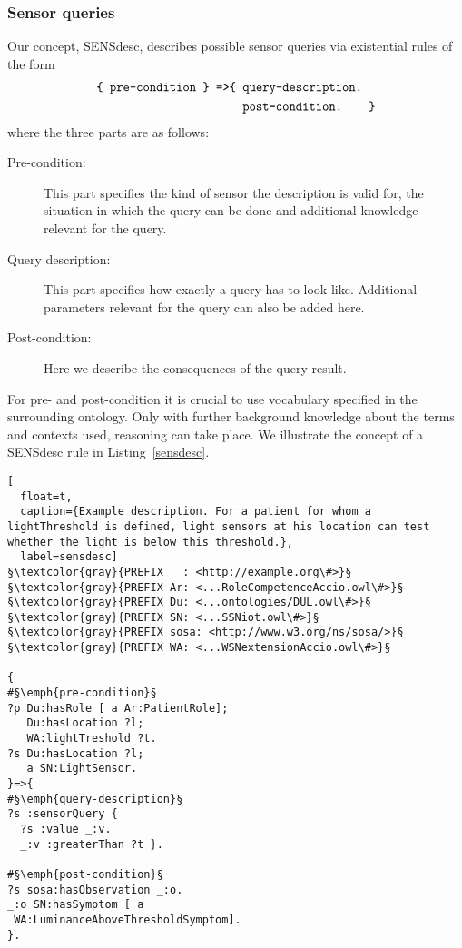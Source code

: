 \subsubsection{Sensor queries}
Our concept, SENSdesc, describes possible sensor queries via existential rules of the form
\begin{align*}
 \texttt{\{ pre-condition \} =>} &\texttt{\{ query-description.}\\&\texttt{\quad post-condition.\qquad\}} 
\end{align*}
where the three parts are as follows:
\begin{description}
\item[Pre-condition:] This part specifies the kind of sensor the description is valid for, the situation in which the query can be done and  
additional knowledge relevant for the query.
\item[Query description:] This part specifies how exactly a query has to look like. 
Additional parameters relevant for the query can also be added here.
\item[Post-condition:] Here we describe the consequences of the query-result. 
\end{description}
For pre- and post-condition it is crucial to use vocabulary specified in the surrounding ontology. Only with further background knowledge about the terms 
and contexts used, reasoning can take place. 
We illustrate the concept of a SENSdesc rule in Listing~\ref{sensdesc}.
\begin{lstlisting}[
  float=t,
  caption={Example description. For a patient for whom a lightThreshold is defined, light sensors at his location can test whether the light is below this threshold.},
  label=sensdesc]
§\textcolor{gray}{PREFIX   : <http://example.org\#>}§ 
§\textcolor{gray}{PREFIX Ar: <...RoleCompetenceAccio.owl\#>}§
§\textcolor{gray}{PREFIX Du: <...ontologies/DUL.owl\#>}§
§\textcolor{gray}{PREFIX SN: <...SSNiot.owl\#>}§
§\textcolor{gray}{PREFIX sosa: <http://www.w3.org/ns/sosa/>}§
§\textcolor{gray}{PREFIX WA: <...WSNextensionAccio.owl\#>}§

{
#§\emph{pre-condition}§
?p Du:hasRole [ a Ar:PatientRole];
   Du:hasLocation ?l;
   WA:lightTreshold ?t.
?s Du:hasLocation ?l;
   a SN:LightSensor.
}=>{
#§\emph{query-description}§
?s :sensorQuery { 
  ?s :value _:v. 
  _:v :greaterThan ?t }.

#§\emph{post-condition}§
?s sosa:hasObservation _:o.
_:o SN:hasSymptom [ a 
 WA:LuminanceAboveThresholdSymptom].
}.
\end{lstlisting}

